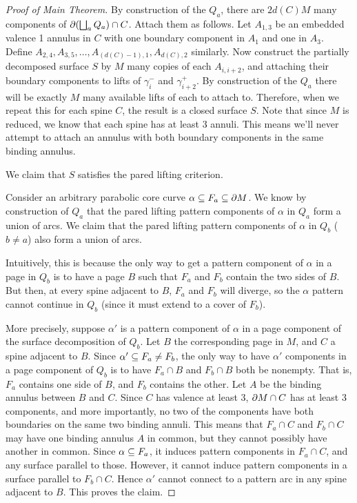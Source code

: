 \begin{proof}[Proof of Main Theorem]
By construction of the $Q_a$, there are $2d(C)M$ many components of
$\partial(\bigsqcup_a Q_a) \cap C$. Attach them as follows. Let $A_{1,3}$ be an
embedded valence 1 annulus in $C$ with one boundary component in $A_1$ and one
in $A_3$. Define $A_{2,4},A_{3,5},\dots,A_{(d(C)-1),1},A_{d(C),2}$ similarly.
Now construct the partially decomposed surface $S$ by $M$ many copies of each
$A_{i,i+2}$, and attaching their boundary components to lifts of $\gamma_i^-$
and $\gamma_{i+2}^+$. By construction of the $Q_a$ there will be exactly $M$
many available lifts of each to attach to. Therefore, when we repeat this for
each spine $C$, the result is a closed surface $S$. Note that since $M$ is
reduced, we know that each spine has at least 3 annuli. This means we'll never
attempt to attach an annulus with both boundary components in the same binding
annulus.

We claim that $S$ satisfies the pared lifting criterion.

Consider an arbitrary parabolic core curve $\alpha \subseteq F_a \subseteq \partial M$. We
know by construction of $Q_a$ that the pared lifting pattern components of
$\alpha$ in $Q_a$ form a union of arcs.  We claim that the pared lifting
pattern components of $\alpha$ in $Q_b$ ($b \neq a$) also form a union of arcs.

Intuitively, this is because the only way to get a pattern component of
$\alpha$ in a page in $Q_b$ is to have a page $B$ such that $F_a$ and $F_b$
contain the two sides of $B$.  But then, at every spine adjacent to $B$, $F_a$
and $F_b$ will diverge, so the $\alpha$ pattern cannot continue in $Q_b$ (since
it must extend to a cover of $F_b$).

More precisely, suppose $\alpha'$ is a pattern component of $\alpha$ in a page
component of the surface decomposition of $Q_b$. Let $B$ the corresponding page
in $M$, and $C$ a spine adjacent to $B$. Since $\alpha' \subseteq F_a \neq F_b$, the
only way to have $\alpha'$ components in a page component of $Q_b$ is to have
$F_a \cap B$ and $F_b \cap B$ both be nonempty. That is, $F_a$ contains one
side of $B$, and $F_b$ contains the other. Let $A$ be the binding annulus
between $B$ and $C$.  Since $C$ has valence at least 3, $\partial M \cap C$ has at
least 3 components, and more importantly, no two of the components have both
boundaries on the same two binding annuli. This means that $F_a \cap C$ and
$F_b \cap C$ may have one binding annulus $A$ in common, but they cannot
possibly have another in common.  Since $\alpha \subseteq F_a$, it induces pattern
components in $F_a \cap C$, and any surface parallel to those. However, it
cannot induce pattern components in a surface parallel to $F_b \cap C$. Hence
$\alpha'$ cannot connect to a pattern arc in any spine adjacent to $B$. This
proves the claim.


\end{proof}
